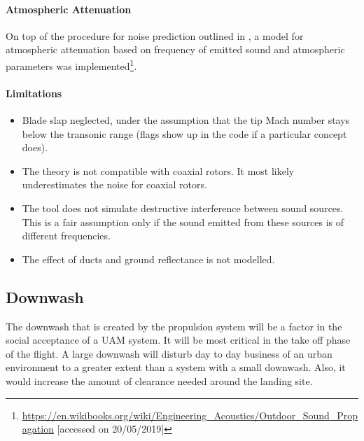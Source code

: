 \paragraph{Atmospheric Attenuation}

On top of the procedure for noise prediction outlined in \cite{Brown2018}, a model for atmospheric attenuation based on frequency of emitted sound and atmospheric parameters was implemented\footnote{\url{ https://en.wikibooks.org/wiki/Engineering_Acoustics/Outdoor_Sound_Propagation} [accessed on 20/05/2019]}.



\paragraph{Limitations}

\begin{itemize}[nolistsep]
    \item Blade slap neglected, under the assumption that the tip Mach number stays below the transonic range (flags show up in the code if a particular concept does).
    \item The theory is not compatible with coaxial rotors. It most likely underestimates the noise for coaxial rotors. 
    \item The tool does not simulate destructive interference between sound sources. This is a fair assumption only if the sound emitted from these sources is of different frequencies.
    \item The effect of ducts and ground reflectance is not modelled.
\end{itemize}
 














\subsection{Downwash}
The downwash that is created by the propulsion system will be a factor in the social acceptance of a UAM system. It will be most critical in the take off phase of the flight. A large downwash will disturb day to day business of an urban environment to a greater extent than a system with a small downwash. Also, it would increase the amount of clearance needed around the landing site. 

